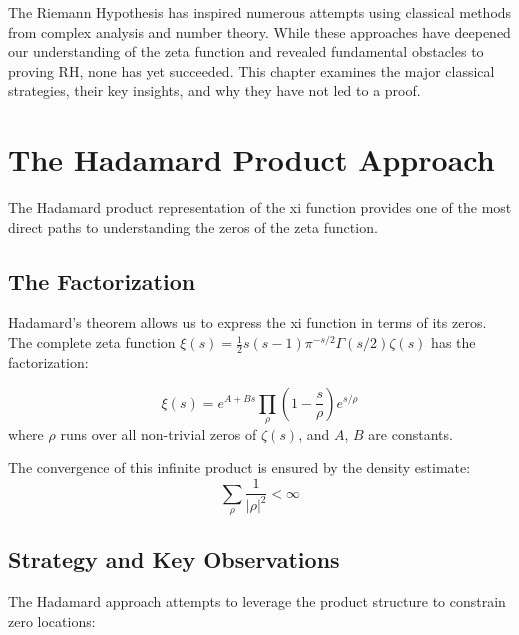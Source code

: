 
The Riemann Hypothesis has inspired numerous attempts using classical methods from complex analysis and number theory. While these approaches have deepened our understanding of the zeta function and revealed fundamental obstacles to proving RH, none has yet succeeded. This chapter examines the major classical strategies, their key insights, and why they have not led to a proof.

\section{The Hadamard Product Approach}

The Hadamard product representation of the xi function provides one of the most direct paths to understanding the zeros of the zeta function.

\subsection{The Factorization}

Hadamard's theorem allows us to express the xi function in terms of its zeros. The complete zeta function $\xi(s) = \frac{1}{2}s(s-1)\pi^{-s/2}\Gamma(s/2)\zeta(s)$ has the factorization:

\begin{theorem}
\begin{equation}
\xi(s) = e^{A+Bs} \prod_{\rho} \left(1 - \frac{s}{\rho}\right)e^{s/\rho}
\end{equation}
where $\rho$ runs over all non-trivial zeros of $\zeta(s)$, and $A$, $B$ are constants.
\end{theorem}

The convergence of this infinite product is ensured by the density estimate:
\begin{equation}
\sum_{\rho} \frac{1}{|\rho|^2} < \infty
\end{equation}

\subsection{Strategy and Key Observations}

The Hadamard approach attempts to leverage the product structure to constrain zero locations:

